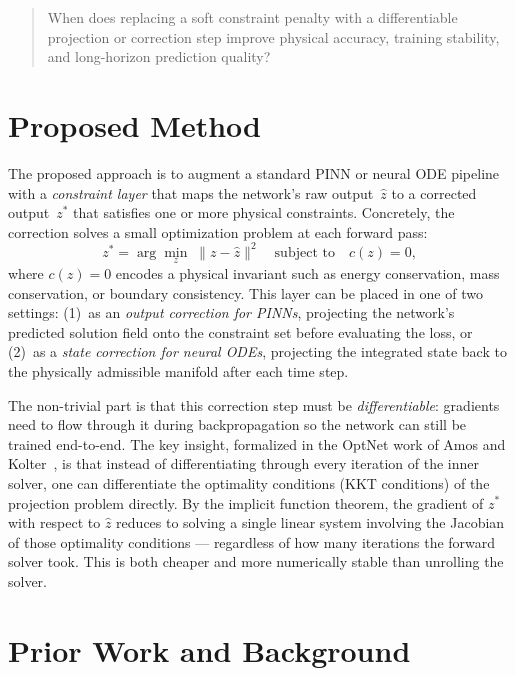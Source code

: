 \documentclass[12pt]{extarticle}
\begin{document}
\begin{quote}
When does replacing a soft constraint penalty with a differentiable
projection or correction step improve physical accuracy, training stability,
and long-horizon prediction quality?
\end{quote}

\section*{Proposed Method}

The proposed approach is to augment a standard PINN or neural ODE pipeline
with a \emph{constraint layer} that maps the network's raw output~$\hat{z}$
to a corrected output~$z^*$ that satisfies one or more physical constraints.
Concretely, the correction solves a small optimization problem at each forward
pass:
\begin{equation}
  z^* = \arg\min_{z}\; \|z - \hat{z}\|^2 \quad \text{subject to} \quad c(z) = 0,
\end{equation}
where $c(z) = 0$ encodes a physical invariant such as energy conservation,
mass conservation, or boundary consistency.
This layer can be placed in one of two settings: (1)~as an \emph{output
correction for PINNs}, projecting the network's predicted solution field onto
the constraint set before evaluating the loss, or (2)~as a
\emph{state correction for neural ODEs}, projecting the integrated state back
to the physically admissible manifold after each time step.

The non-trivial part is that this correction step must be
\emph{differentiable}: gradients need to flow through it during
backpropagation so the network can still be trained end-to-end.
The key insight, formalized in the OptNet work of Amos and
Kolter~\cite{amos2017}, is that instead of differentiating through every
iteration of the inner solver, one can differentiate the optimality
conditions (KKT conditions) of the projection problem directly. By the
implicit function theorem, the gradient of $z^*$ with respect to $\hat{z}$
reduces to solving a single linear system involving the Jacobian of those
optimality conditions --- regardless of how many iterations the forward solver
took. This is both cheaper and more numerically stable than unrolling the
solver.

\section*{Prior Work and Background}
\end{document}
